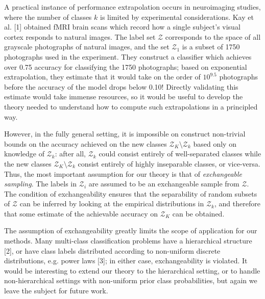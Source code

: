 \documentclass[12pt]{article}
\begin{document}
A practical instance of performance extrapolation occurs in neuroimaging studies, where the number of classes $k$ is
limited by experimental considerations.
Kay et al. [1] obtained fMRI brain scans which record how a single subject's visual cortex responds to natural images.
The label set $\mathcal{Z}$ corresponds to the space of all grayscale photographs of natural images,
and the set $\mathcal{Z}_1$ is a subset of 1750 photographs used in the experiment.
They construct a classifier which achieves over 0.75 accuracy for classifying the 1750 photographs;
based on exponential extrapolation, they estimate that it would take on the order of $10^{9.5}$ photographs
before the accuracy of the model drops below 0.10!  Directly validating this estimate would take immense resources,
so it would be useful to develop the theory needed to understand how to compute such extrapolations
in a principled way. 

However, in the fully general setting, it is impossible on construct
non-trivial bounds on the accuracy achieved on the new classes $\mathcal{Z}_K \setminus \mathcal{Z}_k$
based only on knowledge of $\mathcal{Z}_k$: after all, $\mathcal{Z}_k$ could consist entirely of well-separated classes
while the new classes $\mathcal{Z}_K \setminus \mathcal{Z}_k$ consist entirely of highly inseparable classes, or vice-versa.
Thus, the most important assumption for our theory is that of \emph{exchangeable sampling}.
The labels in $\mathcal{Z}_i$ are assumed to be an exchangeable sample from $\mathcal{Z}$.
The condition of exchangeability ensures that the separability of random subsets of $\mathcal{Z}$ can be inferred
by looking at the empirical distributions in $\mathcal{Z}_k$, and therefore that some estimate of the achievable
accuracy on $\mathcal{Z}_K$ can be obtained.

The assumption of exchangeability greatly limits the scope of application for our methods.
Many multi-class classification problems
have a hierarchical structure [2], or have class labels distributed according to
non-uniform discrete distributions, e.g. power laws [3]; in either case, exchangeability is violated.
It would be interesting to extend our theory to the hierarchical setting, or to handle non-hierarchical settings
with non-uniform prior class probabilities, but again we leave the subject for future work.
\end{document}
